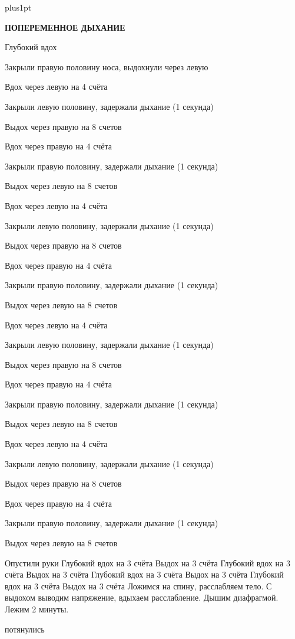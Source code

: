 \nopagenumbers
\def\cycle{
  Вдох через левую на 4 счёта \par
  Закрыли левую половину, задержали дыхание (1 секунда) \par
  Выдох через правую на 8 счетов \par
  Вдох через правую на 4 счёта \par
  Закрыли правую половину, задержали дыхание (1 секунда) \par
  Выдох через левую на 8 счетов \par
}
\parindent=0pt
\parskip=7pt plus1pt
\centerline{\bf ПОПЕРЕМЕННОЕ ДЫХАНИЕ}
\bigskip
Глубокий вдох \par
Закрыли правую половину носа, выдохнули через левую \par
\cycle
\cycle
\cycle
\cycle
\begingroup
\obeylines
Опустили руки
Глубокий вдох на 3 счёта
Выдох на 3 счёта
Глубокий вдох на 3 счёта
Выдох на 3 счёта
Глубокий вдох на 3 счёта
Выдох на 3 счёта
Глубокий вдох на 3 счёта
Выдох на 3 счёта
\endgroup
Ложимся на спину, расслабляем тело. С выдохом выводим напряжение, вдыхаем расслабление.
Дышим диафрагмой. Лежим 2 минуты. \par
потянулись
\bye
